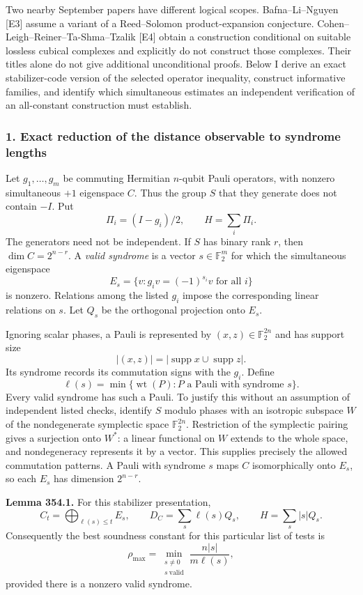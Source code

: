 \documentclass[11pt]{article}
\begin{document}
Two nearby September papers have different logical scopes. Bafna--Li--Nguyen [E3] assume a variant of a Reed--Solomon product-expansion conjecture. Cohen--Leigh--Reiner--Ta-Shma--Tzalik [E4] obtain a construction conditional on suitable lossless cubical complexes and explicitly do not construct those complexes. Their titles alone do not give additional unconditional proofs. Below I derive an exact stabilizer-code version of the selected operator inequality, construct informative families, and identify which simultaneous estimates an independent verification of an all-constant construction must establish.

\subsubsection{1. Exact reduction of the distance observable to syndrome lengths}
Let $g_1,\ldots,g_m$ be commuting Hermitian $n$-qubit Pauli operators, with nonzero simultaneous $+1$ eigenspace $C$. Thus the group $S$ that they generate does not contain $-I$. Put
\[
 \Pi_i=(I-g_i)/2,\qquad H=\sum_i\Pi_i.
\]
The generators need not be independent. If $S$ has binary rank $r$, then $\dim C=2^{n-r}$. A \emph{valid syndrome} is a vector $s\in\mathbb F_2^m$ for which the simultaneous eigenspace
\[
 E_s=\{v:g_iv=(-1)^{s_i}v\text{ for all }i\}
\]
is nonzero. Relations among the listed $g_i$ impose the corresponding linear relations on $s$. Let $Q_s$ be the orthogonal projection onto $E_s$.

Ignoring scalar phases, a Pauli is represented by $(x,z)\in\mathbb F_2^{2n}$ and has support size
\[
 |(x,z)|=|\operatorname{supp}x\cup\operatorname{supp}z|.
\]
Its syndrome records its commutation signs with the $g_i$. Define
\[
 \ell(s)=\min\{\operatorname{wt}(P):P\text{ a Pauli with syndrome }s\}.
 \tag{354.1}
\]
Every valid syndrome has such a Pauli. To justify this without an assumption of independent listed checks, identify $S$ modulo phases with an isotropic subspace $W$ of the nondegenerate symplectic space $\mathbb F_2^{2n}$. Restriction of the symplectic pairing gives a surjection onto $W^*$: a linear functional on $W$ extends to the whole space, and nondegeneracy represents it by a vector. This supplies precisely the allowed commutation patterns. A Pauli with syndrome $s$ maps $C$ isomorphically onto $E_s$, so each $E_s$ has dimension $2^{n-r}$.

\textbf{Lemma 354.1.} For this stabilizer presentation,
\[
 C_t=\bigoplus_{\ell(s)\le t}E_s,\qquad
 D_C=\sum_s\ell(s)Q_s,\qquad
 H=\sum_s|s|Q_s.
 \tag{354.2}
\]
Consequently the best soundness constant for this particular list of tests is
\[
 \rho_{\max}=\min_{\substack{s\ne0\\s\ \text{valid}}}
                 \frac{n|s|}{m\ell(s)},
 \tag{354.3}
\]
provided there is a nonzero valid syndrome.
\end{document}
